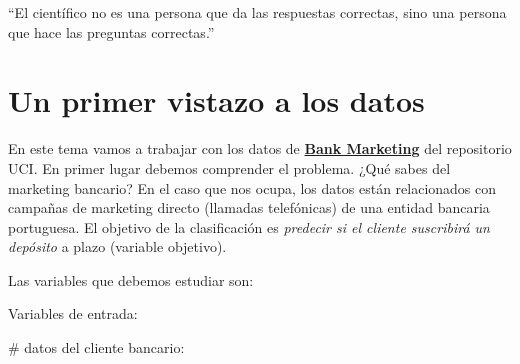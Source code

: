 \documentclass[
  letterpaper,
  DIV=11,
  numbers=noendperiod]{scrreprt}
\begin{document}
\begin{tcolorbox}[enhanced jigsaw, arc=.35mm, breakable, coltitle=black, left=2mm, opacityback=0, bottomtitle=1mm, colbacktitle=quarto-callout-tip-color!10!white, title=\textcolor{quarto-callout-tip-color}{\faLightbulb}\hspace{0.5em}{Claude Lévi-Strauss}, titlerule=0mm, colback=white, colframe=quarto-callout-tip-color-frame, bottomrule=.15mm, rightrule=.15mm, opacitybacktitle=0.6, toptitle=1mm, toprule=.15mm, leftrule=.75mm]

``El científico no es una persona que da las respuestas correctas, sino
una persona que hace las preguntas correctas.''

\end{tcolorbox}

\hypertarget{un-primer-vistazo-a-los-datos}{%
\section{Un primer vistazo a los
datos}\label{un-primer-vistazo-a-los-datos}}

En este tema vamos a trabajar con los datos de
\href{https://archive.ics.uci.edu/dataset/222/bank+marketing}{\textbf{Bank
Marketing}} del repositorio UCI. En primer lugar debemos comprender el
problema. ¿Qué sabes del marketing bancario? En el caso que nos ocupa,
los datos están relacionados con campañas de marketing directo (llamadas
telefónicas) de una entidad bancaria portuguesa. El objetivo de la
clasificación es \emph{predecir si el cliente suscribirá un depósito} a
plazo (variable objetivo).

Las variables que debemos estudiar son:

Variables de entrada:

\# datos del cliente bancario:
\end{document}
